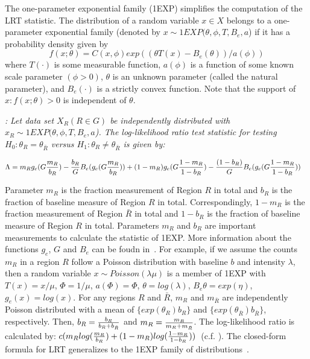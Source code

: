\documentclass[AMA,LATO1COL]{WileyNJD-v2}
\begin{document}
The one-parameter exponential family (1EXP) simplifies the computation of the LRT statistic. The distribution of a random variable $x\in X$ belongs to a one-parameter exponential family \cite{DagMaxmize} (denoted by $x\sim 1EXP(\theta,\phi,T,B_e,a$) if it has a probability density given by
\begin{equation}
f(x; \theta )=C(x,\phi)exp((\theta T(x)-B_e(\theta))/a(\phi))
\label{oneexp}
\end{equation}
where  $T(\cdot)$ is some measurable function, $a(\phi)$ is a function of some known scale parameter $(\phi>0)$, $\theta$ is an unknown parameter (called the natural parameter), and $B_e(\cdot)$ is a strictly convex function. Note that the support of ${x:f(x;\theta)>0}$ is independent of $\theta$.
\begin{theorem}\label{thm1}
{\it\cite{DagMaxmize}:}
{\it Let data set $X_R (R\in G)$ be independently distributed with $x_R\sim 1EXP(\theta,\phi,T,B_e,a$). The log-likelihood ratio test statistic for testing $H_{0}: \theta_R = \theta_{\bar R}$ versus $H_{1}: \theta_R \neq \theta_{\bar R}$ is given by:}

\begin{eqnarray}
\Lambda&={m_R}g_e({G{m_R\over b_R}})-{b_R\over G} {B_e(g_e(G{m_R\over b_R}))} +(1-m_R)g_e({G{1-m_R\over {1-b_R}}})-{(1-b_R)\over G}{B_e(g_e({G{1-m_R\over {1-b_R}}}))}
\label{eq}
\end{eqnarray}
\label{thm1}
\end{theorem}
Parameter $m_R$ is the fraction measurement of Region $R$ in total and $b_R$ is the fraction of baseline measure of Region $R$ in total. Correspondingly, $1-m_R$ is the fraction measurement of Region $\bar R$ in total and $1-b_R$ is the fraction of baseline measure of Region $R$ in total. Parameters $m_R$  and $b_R$ are important measurements to calculate the statistic of 1EXP. More information about the functions $g_e$, $G$ and $B_e$ can be foudn in~\cite{DagMaxmize}.
For example, if we assume the counts $m_R$ in a region $R$ follow a Poisson distribution with baseline $b$ and intensity $\lambda$, then a random variable $x \sim Poisson(\lambda \mu)$ is a member of 1EXP with $T(x)=x/\mu$, $\Phi=1/\mu$, $a(\Phi)=\Phi$, $\theta=log(\lambda)$, $B_e{\theta}=exp(\eta)$, $g_e{(x)}=log(x)$. For any regions $R$ and $\bar R$, $m_R$ and $m_{\bar R}$ are independently Poisson distributed with a mean of $\{exp(\theta_R)b_R\}$ and $\{exp(\theta_{\bar R})b_{\bar R}\}$, respectively. Then, $b_R={b_R\over {b_R+b_{\bar R}}}$ and $m_R={m_R\over {m_R+m_{\bar R}}}$. The log-likelihood ratio is calculated by: $c(m_R log ({m_R\over {b_R}})+ (1-m_R)log({{1-m_R}\over {1-b_R} }))$~(c.f. \cite{DagMaxmize}). The closed-form formula for LRT generalizes to the 1EXP family of distributions~\cite{DagMaxmize}.
\end{document}
